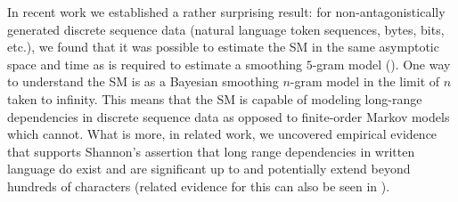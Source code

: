 \documentclass[12pt]{article}
\begin{document}
{In recent work we established a rather surprising result: for non-antagonistically generated discrete sequence data (natural language token sequences, bytes, bits, etc.), we found that it was possible to estimate  the SM in the same asymptotic space and time as is required to estimate a smoothing $5$-gram model \citep{Wood2009} ().  One way to understand the SM is as a Bayesian smoothing $n$-gram model in the limit of $n$ taken to infinity.  This means that the SM is capable of modeling long-range dependencies in discrete sequence data as opposed to finite-order Markov models which cannot.  What is more, in related work, we uncovered empirical evidence that supports Shannon's assertion \citep{Shannon1951} that long range dependencies in written language do exist and are significant up to and potentially extend beyond hundreds of characters \cite{Gasthaus2010} (related evidence for this can also be seen in ).  
\begin{figure}[htbp]
\begin{center}
\hspace{1.5cm}

\end{center}
\end{figure}}
\end{document}
